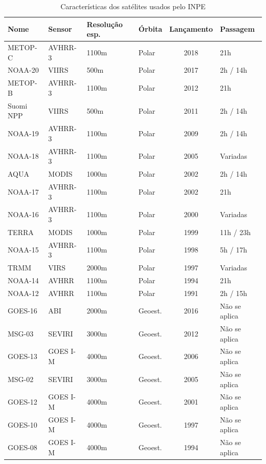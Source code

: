 \documentclass[cic,tc]{iiufrgs}
\begin{document}
\begin{table}[htbp]
\centering
\caption{Características dos satélites usados pelo INPE}
\begin{tabular}{ @{}llllcl@{} }
  \toprule
  Nome    & Sensor & Resolução esp. & Órbita & Lançamento & Passagem \\
  \midrule
  METOP-C & AVHRR-3  & 1100m       & Polar   & 2018 & 21h \\
  NOAA-20 & VIIRS    & 500m        & Polar   & 2017 & 2h / 14h \\
  METOP-B & AVHRR-3  & 1100m       & Polar   & 2012 & 21h \\
  Suomi NPP & VIIRS  & 500m        & Polar   & 2011 & 2h / 14h \\
  NOAA-19 & AVHRR-3  & 1100m       & Polar   & 2009 & 2h / 14h \\
  NOAA-18 & AVHRR-3  & 1100m       & Polar   & 2005 & Variadas \\
  AQUA    & MODIS    & 1000m       & Polar   & 2002 & 2h / 14h \\
  NOAA-17 & AVHRR-3  & 1100m       & Polar   & 2002 & 21h \\
  NOAA-16 & AVHRR-3  & 1100m       & Polar   & 2000 & Variadas \\
  TERRA   & MODIS    & 1000m       & Polar   & 1999 & 11h / 23h \\
  NOAA-15 & AVHRR-3  & 1100m       & Polar   & 1998 & 5h / 17h \\
  TRMM    & VIRS     & 2000m       & Polar   & 1997 & Variadas \\
  NOAA-14 & AVHRR    & 1100m       & Polar   & 1994 & 21h \\
  NOAA-12 & AVHRR    & 1100m       & Polar   & 1991 & 2h / 15h \\
  GOES-16 & ABI      & 2000m       & Geoest. & 2016 & Não se aplica \\
  MSG-03  & SEVIRI   & 3000m       & Geoest. & 2012 & Não se aplica \\
  GOES-13 & GOES I-M & 4000m       & Geoest. & 2006 & Não se aplica \\
  MSG-02  & SEVIRI   & 3000m       & Geoest. & 2005 & Não se aplica \\
  GOES-12 & GOES I-M & 4000m       & Geoest. & 2001 & Não se aplica \\
  GOES-10 & GOES I-M & 4000m       & Geoest. & 1997 & Não se aplica \\
  GOES-08 & GOES I-M & 4000m       & Geoest. & 1994 & Não se aplica \\
  \bottomrule
\end{tabular}
\label{table:satelites}
\end{table}
\end{document}
